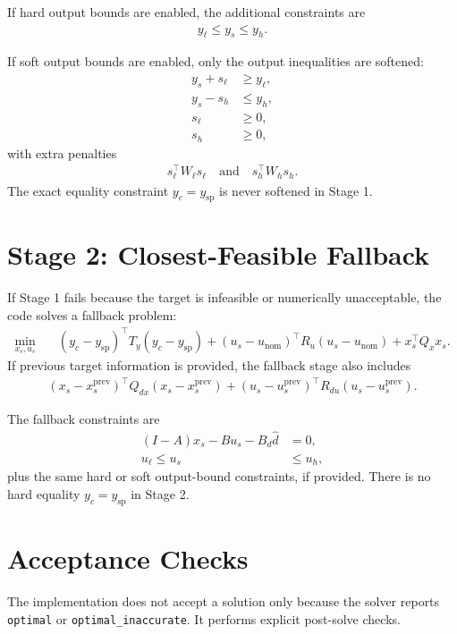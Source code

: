 \documentclass[11pt]{article}
\begin{document}
If hard output bounds are enabled, the additional constraints are
\begin{align}
    y_{\ell} \le y_s \le y_h.
\end{align}

If soft output bounds are enabled, only the output inequalities are softened:
\begin{align}
    y_s + s_{\ell} &\ge y_{\ell}, \\
    y_s - s_{h} &\le y_h, \\
    s_{\ell} &\ge 0, \\
    s_{h} &\ge 0,
\end{align}
with extra penalties
\begin{align}
    s_{\ell}^\top W_{\ell} s_{\ell}
    \quad \text{and} \quad
    s_{h}^\top W_{h} s_{h}.
\end{align}
The exact equality constraint $y_c = y_{\mathrm{sp}}$ is never softened in Stage 1.

\section{Stage 2: Closest-Feasible Fallback}
If Stage 1 fails because the target is infeasible or numerically unacceptable,
the code solves a fallback problem:
\begin{align}
    \min_{x_s,u_s} \quad
    & (y_c-y_{\mathrm{sp}})^\top T_y (y_c-y_{\mathrm{sp}})
    + (u_s-u_{\mathrm{nom}})^\top R_u (u_s-u_{\mathrm{nom}})
    + x_s^\top Q_x x_s.
\end{align}
If previous target information is provided, the fallback stage also includes
\begin{align}
    (x_s-x_s^{\mathrm{prev}})^\top Q_{dx}(x_s-x_s^{\mathrm{prev}})
    + (u_s-u_s^{\mathrm{prev}})^\top R_{du}(u_s-u_s^{\mathrm{prev}}).
\end{align}

The fallback constraints are
\begin{align}
    (I-A)x_s - B u_s - B_d \hat d &= 0, \\
    u_{\ell} \le u_s &\le u_h,
\end{align}
plus the same hard or soft output-bound constraints, if provided. There is no
hard equality $y_c = y_{\mathrm{sp}}$ in Stage 2.

\section{Acceptance Checks}
The implementation does not accept a solution only because the solver reports
\texttt{optimal} or \texttt{optimal\_inaccurate}. It performs explicit
post-solve checks.
\end{document}
